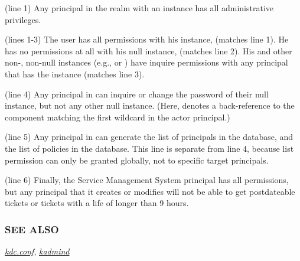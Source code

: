\documentclass[letterpaper,10pt,english]{sphinxmanual}
\begin{document}
(line 1) Any principal in the  realm with
an  instance has all administrative privileges.

(lines 1-3) The user  has all permissions with his
 instance,  (matches line
1).  He has no permissions at all with his null instance,
 (matches line 2).  His  and other
non-, non-null instances (e.g.,  or ) have
inquire permissions with any principal that has the instance 
(matches line 3).

(line 4) Any  principal in  can inquire
or change the password of their null instance, but not any other
null instance.  (Here,  denotes a back-reference to the
component matching the first wildcard in the actor principal.)

(line 5) Any  principal in  can generate
the list of principals in the database, and the list of policies
in the database.  This line is separate from line 4, because list
permission can only be granted globally, not to specific target
principals.

(line 6) Finally, the Service Management System principal
 has all permissions, but any principal that it
creates or modifies will not be able to get postdateable tickets or
tickets with a life of longer than 9 hours.


\subsubsection{SEE ALSO}
\label{admin/conf_files/kadm5_acl:see-also}
{\hyperref[admin/conf_files/kdc_conf:kdc-conf-5]{\emph{kdc.conf}}}, {\hyperref[admin/admin_commands/kadmind:kadmind-8]{\emph{kadmind}}}
\end{document}
